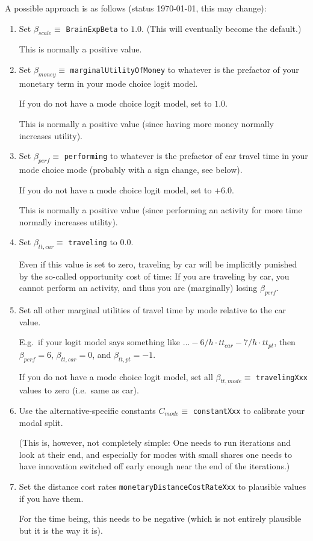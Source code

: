 A possible approach is as follows (status \today, this may change):
\begin{enumerate}

\item Set $\beta_{scale} \equiv$ \verb$BrainExpBeta$ to $1.0$.  (This will eventually become the default.)

This is normally a positive value.

\item Set $\beta_{money} \equiv$ \verb$marginalUtilityOfMoney$ to whatever is the prefactor of your monetary term in your mode choice logit model.

If you do not have a mode choice logit model, set to $1.0$. 

This is normally a positive value (since having more money normally increases utility).

\item Set $\beta_{perf} \equiv$ \verb$performing$ to whatever is the prefactor of car travel time in your mode choice mode (probably with a sign change, see below).

If you do not have a mode choice logit model, set to $+6.0$.

This is normally a positive value (since performing an activity for more time normally increases utility).

\item Set $\beta_{tt,car} \equiv$ \verb$traveling$ to $0.0$.

  Even if this value is set to zero, traveling by car will be implicitly punished by the so-called opportunity cost of time: If you are traveling by car, you cannot perform an activity, and thus you are (marginally) losing $\beta_{perf}$.

\item Set all other marginal utilities of travel time by mode relative to the car value.

E.g.\ if your logit model says something like $... -6/h \cdot tt_{car} - 7/h \cdot tt_{pt}$, then $\beta_{perf} = 6$, $\beta_{tt,car} = 0$, and $\beta_{tt,pt} = -1$.

If you do not have a mode choice logit model, set all $\beta_{tt,mode} \equiv$ \verb$travelingXxx$ values to zero (i.e.\ same as car).

\item Use the alternative-specific constants $C_{mode} \equiv$ \verb$constantXxx$ to calibrate your modal split.

(This is, however, not completely simple: One needs to run iterations and look at their end, and especially for modes with small shares one needs to have innovation switched off early enough near the end of the iterations.)

\item Set the distance cost rates \verb$monetaryDistanceCostRateXxx$ to plausible values if you have them.

For the time being, this needs to be negative (which is not entirely plausible but it is the way it is).

\end{enumerate}

